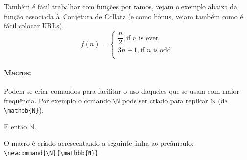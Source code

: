 \documentclass[10pt]{article}
\newcommand{\N}{\mathbb{N}}
\begin{document}
Também é fácil trabalhar com funções por ramos, vejam o exemplo abaixo da função associada à~\href{https://en.wikipedia.org/wiki/Collatz_conjecture}{Conjetura de Collatz} (e como bónus, vejam também como é fácil colocar URLs). 
\[   
f(n) = 
     \begin{cases}
       \dfrac{n}{2}, \text{if $n$ is even}\\
       3n+1, \text{if $n$ is odd}\\
     \end{cases}
\]



\paragraph*{Macros:}
Podem-se criar comandos para facilitar o uso daqueles que se usam com maior frequência. Por exemplo o comando \verb|\N| pode ser criado para replicar $\mathbb{N}$ (de \verb|\mathbb{N}|).

E então $\N$.

O macro é criado acrescentando a seguinte linha ao preâmbulo:\\
\verb|\newcommand{\N}{\mathbb{N}}|







\end{document}
